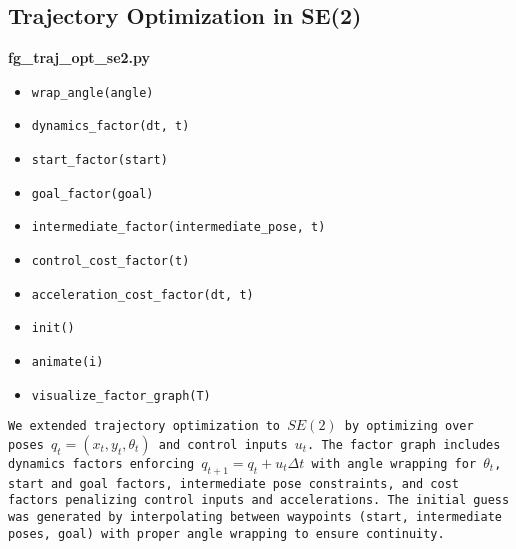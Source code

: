 \documentclass{article}
\begin{document}
\subsection*{Trajectory Optimization in SE(2) }
\bfseries{fg\_traj\_opt\_se2.py}
\begin{itemize}
    \item \texttt{wrap\_angle(angle)}
    \item \texttt{dynamics\_factor(dt, t)}
    \item \texttt{start\_factor(start)}
    \item \texttt{goal\_factor(goal)}
    \item \texttt{intermediate\_factor(intermediate\_pose, t)}
    \item \texttt{control\_cost\_factor(t)}
    \item \texttt{acceleration\_cost\_factor(dt, t)}
    \item \texttt{init()}
    \item \texttt{animate(i)}
    \item \texttt{visualize\_factor\_graph(T)}
\end{itemize}
\texttt{We extended trajectory optimization to \( SE(2) \) by optimizing over poses \( q_t = (x_t, y_t, \theta_t) \) and control inputs \( u_t \). The factor graph includes dynamics factors enforcing \( q_{t+1} = q_t + u_t \Delta t \) with angle wrapping for \( \theta_t \), start and goal factors, intermediate pose constraints, and cost factors penalizing control inputs and accelerations. The initial guess was generated by interpolating between waypoints (start, intermediate poses, goal) with proper angle wrapping to ensure continuity.}
\end{document}
